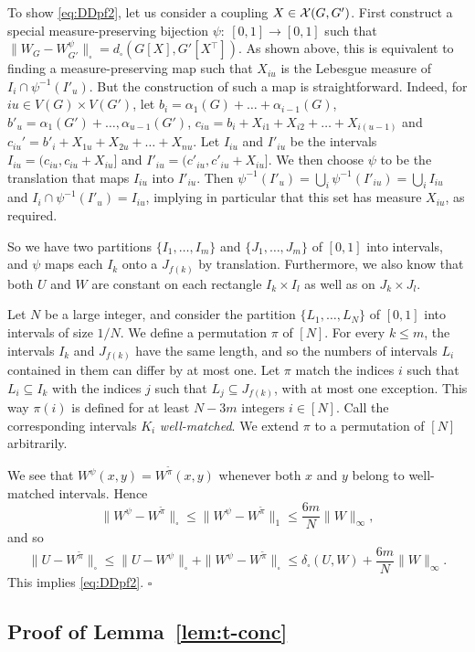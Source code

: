 \documentclass[12pt]{article}
\numberwithin{equation}{section}
\def\T{{^\top}}
\begin{document}
To show \eqref{eq:DDpf2}, let us consider a coupling $X\in
{\cal X}(G,G')$. First construct a special measure-preserving bijection
$\psi:~[0,1]\to[0,1]$ such that
$\|W_G-W_{G'}^\psi\|_\square=d_\square(G[X],G'[X\T])$. As shown
above, this is equivalent to finding a measure-preserving map such
that $X_{iu}$ is the Lebesgue measure of $I_i\cap\psi^{-1}(I'_u)$.
But the construction of such a map is straightforward. Indeed, for
$iu\in V(G)\times V(G')$, let
$b_i=\alpha_1(G)+\dots+\alpha_{i-1}(G)$,
$b'_u=\alpha_1(G')+\dots,\alpha_{u-1}(G')$,
$c_{iu}=b_i+X_{i1}+X_{i2}+\dots+X_{i(u-1)}$ and
$c_{iu}'=b'_i+X_{1u}+X_{2u}+\dots+X_{nu}$. Let $I_{iu}$ and $I'_{iu}$
be the intervals $I_{iu}=(c_{iu},c_{iu}+X_{iu}]$ and
$I'_{iu}=(c'_{iu},c'_{iu}+X_{iu}]$. We then choose $\psi$ to be the
translation that maps $I_{iu}$ into $I'_{iu}$. Then
$\psi^{-1}(I'_u)=\bigcup_i\psi^{-1}(I'_{iu})=\bigcup_iI_{iu}$ and
$I_i\cap \psi^{-1}(I'_u)=I_{iu}$, implying in particular that this
set has measure $X_{iu}$, as required.

So we have two partitions $\{I_1,\dots,I_m\}$ and $\{J_1,\dots,J_m\}$
of $[0,1]$ into intervals, and $\psi$ maps each $I_k$ onto a
$J_{f(k)}$ by translation. Furthermore, we also know that both $U$
and $W$ are constant on each rectangle $I_k\times I_l$ as well as on
$J_k\times J_l$.

Let $N$ be a large integer, and consider the partition
$\{L_1,\dots,L_N\}$ of $[0,1]$ into intervals of size $1/N$. We
define a permutation $\pi$ of $[N]$. For every $k\le m$, the
intervals $I_k$ and $J_{f(k)}$ have the same length, and so the
numbers of intervals $L_i$ contained in them can differ by at most
one. Let $\pi$ match the indices $i$ such that $L_i\subseteq I_k$
with the indices $j$ such that $L_j\subseteq J_{f(k)}$, with at most
one exception. This way $\pi(i)$ is defined for at least $N-3m$
integers $i\in[N]$. Call the corresponding intervals $K_i$ {\it
well-matched}. We extend $\pi$ to a permutation of $[N]$ arbitrarily.

We see that $W^{\psi}(x,y)=W^{\tilde{\pi}}(x,y)$ whenever both $x$
and $y$ belong to well-matched intervals. Hence
\[
\|W^{\psi}-W^{\tilde{\pi}}\|_\square\le
\|W^{\psi}-W^{\tilde{\pi}}\|_1 \le \frac{6m}{N}\|W\|_\infty,
\]
and so
\[
\|U-W^{\tilde{\pi}}\|_\square \le \|U-W^\psi\|_\square +
\|W^{\psi}-W^{\tilde{\pi}}\|_\square \le
\delta_\square(U,W)+\frac{6m}{N}\|W\|_\infty.
\]
This implies \eqref{eq:DDpf2}.  \hfill$\square$

\subsection{Proof of Lemma~\ref{lem:t-conc}}
\end{document}
